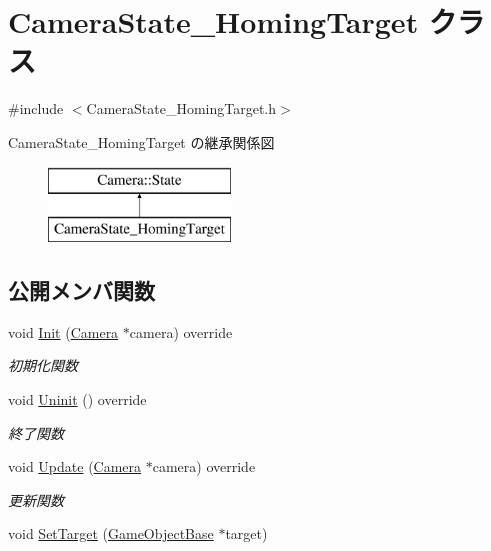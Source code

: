 \hypertarget{class_camera_state___homing_target}{}\section{Camera\+State\+\_\+\+Homing\+Target クラス}
\label{class_camera_state___homing_target}


{\ttfamily \#include $<$Camera\+State\+\_\+\+Homing\+Target.\+h$>$}

Camera\+State\+\_\+\+Homing\+Target の継承関係図\begin{figure}[H]
\begin{center}
\leavevmode
\includegraphics[height=2.000000cm]{class_camera_state___homing_target}
\end{center}
\end{figure}
\subsection*{公開メンバ関数}
\begin{DoxyCompactItemize}
\item 
void \mbox{\hyperlink{class_camera_state___homing_target_a9222190a5f26d564e99623b05941d382}{Init}} (\mbox{\hyperlink{class_camera}{Camera}} $\ast$camera) override
\begin{DoxyCompactList}\small\item\em 初期化関数 \end{DoxyCompactList}\item 
void \mbox{\hyperlink{class_camera_state___homing_target_ab2b5379b35ebafc53189bf4d45646c8c}{Uninit}} () override
\begin{DoxyCompactList}\small\item\em 終了関数 \end{DoxyCompactList}\item 
void \mbox{\hyperlink{class_camera_state___homing_target_a98f04985c06033febdad32d6357088c9}{Update}} (\mbox{\hyperlink{class_camera}{Camera}} $\ast$camera) override
\begin{DoxyCompactList}\small\item\em 更新関数 \end{DoxyCompactList}\item 
void \mbox{\hyperlink{class_camera_state___homing_target_a5beacf25aaff9547b5c4e32cec698e28}{Set\+Target}} (\mbox{\hyperlink{class_game_object_base}{Game\+Object\+Base}} $\ast$target)
\end{DoxyCompactItemize}


